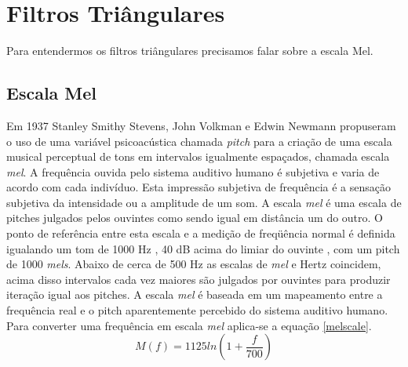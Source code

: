 \section{Filtros Triângulares}
\label{sec:filt:tri}
\quad Para entendermos os filtros triângulares precisamos falar sobre a escala Mel.

\subsection{Escala Mel}
\quad Em 1937 Stanley Smithy Stevens, John Volkman e Edwin Newmann propuseram o uso de uma variável psicoacústica chamada \textit{pitch}  para a criação de uma escala musical perceptual de tons em intervalos igualmente espaçados, chamada escala \textit{mel}. A frequência ouvida pelo sistema auditivo humano é subjetiva e varia de acordo com cada indivíduo. Esta impressão subjetiva de frequência é a sensação subjetiva da intensidade ou a amplitude de um som. A escala \textit{mel} é uma escala de pitches julgados pelos ouvintes como sendo igual em distância um do outro. O ponto de referência entre esta escala e a medição de freqüência normal é definida  igualando um tom de 1000 Hz , 40 dB acima do limiar do ouvinte , com um pitch de 1000 \textit{mels}. Abaixo de cerca de 500 Hz as escalas de \textit{mel} e Hertz coincidem, acima disso intervalos cada vez maiores são julgados por ouvintes para produzir iteração igual aos pitches. A escala \textit{mel} é baseada em um mapeamento entre a frequência real e o pitch aparentemente percebido do sistema auditivo humano. Para converter uma frequência em escala \textit{mel} aplica-se a equação \ref{melscale}.
\begin{equation}
\label{melscale}
M(f) = 1125 ln(1 + \frac{f}{700})
\end{equation}


